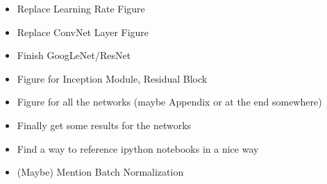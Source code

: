 \documentclass[preprint,12pt,3p]{elsarticle}
\begin{document}
\begin{itemize}
    \item Replace Learning Rate Figure
    \item Replace ConvNet Layer Figure
    \item Finish GoogLeNet/ResNet
    \item Figure for Inception Module, Residual Block
    \item Figure for all the networks (maybe Appendix or at the end somewhere)
    \item Finally get some results for the networks
    \item Find a way to reference ipython notebooks in a nice way
    \item (Maybe) Mention Batch Normalization
\end{itemize}










\newpage

 
\newpage






\appendix
\end{document}
